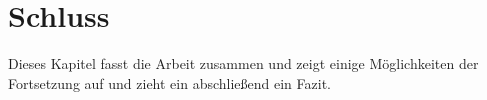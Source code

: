 \chapter{Schluss}
    \label{chapter:SummaryAndOutlook}
    Dieses Kapitel fasst die Arbeit zusammen
    und zeigt einige Möglichkeiten der Fortsetzung auf
    und zieht ein abschließend ein Fazit.

    
    
    